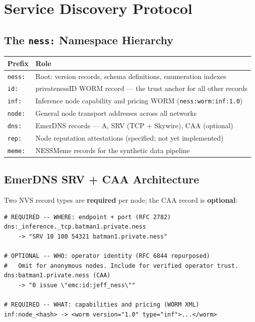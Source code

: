 \documentclass[11pt,a4paper]{article}
\begin{document}
\section{Service Discovery Protocol}
\label{sec:discovery}

\subsection{The \texttt{ness:} Namespace Hierarchy}

\begin{center}
\begin{tabular}{@{}ll@{}}
\toprule
Prefix & Role \\
\midrule
\texttt{ness:} & Root: version records, schema definitions, enumeration indexes \\
\texttt{id:} & privatenessID WORM record — the trust anchor for all other records \\
\texttt{inf:} & Inference node capability and pricing WORM (\texttt{ness:worm:inf:1.0}) \\
\texttt{node:} & General node transport addresses across all networks \\
\texttt{dns:} & EmerDNS records — A, SRV (TCP + Skywire), CAA (optional) \\
\texttt{rep:} & Node reputation attestations (specified; not yet implemented) \\
\texttt{meme:} & NESSMeme records for the synthetic data pipeline \\
\bottomrule
\end{tabular}
\end{center}

\subsection{EmerDNS SRV + CAA Architecture}

Two NVS record types are \textbf{required} per node; the CAA record is \textbf{optional}:

\begin{lstlisting}[caption={NVS record set for one inference node}]
# REQUIRED -- WHERE: endpoint + port (RFC 2782)
dns:_inference._tcp.batman1.private.ness
    -> "SRV 10 100 54321 batman1.private.ness"

# OPTIONAL -- WHO: operator identity (RFC 6844 repurposed)
#   Omit for anonymous nodes. Include for verified operator trust.
dns:batman1.private.ness (CAA)
    -> "0 issue \"emc:id:jeff_ness\""

# REQUIRED -- WHAT: capabilities and pricing (WORM XML)
inf:node_<hash> -> <worm version="1.0" type="inf">...</worm>
\end{lstlisting}
\end{document}
